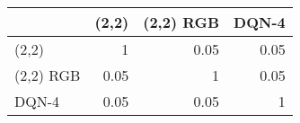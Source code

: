 \begin{tabular}{lrrr}
\hline
           &   (2,2) &   (2,2) RGB &   DQN-4 \\
\hline
 (2,2)     &    1    &        0.05 &    0.05 \\
 (2,2) RGB &    0.05 &        1    &    0.05 \\
 DQN-4     &    0.05 &        0.05 &    1    \\
\hline
\end{tabular}